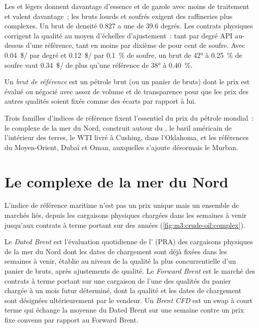 Les  et légers donnent davantage d'essence et de gazole avec moins de traitement et
valent davantage~; les bruts lourds et soufrés exigent des raffineries plus complexes. Un brut de
densité 0.827 a une  de 39.6 degrés. Les contrats physiques corrigent la qualité au moyen
d'échelles d'ajustement~: tant par degré API au-dessus d'une référence, tant en moins par dixième
de pour cent de soufre. Avec \qty{0.04}{\$/\barrel} par degré et
\qty{0.12}{\$/\barrel} par 0.1~\% de soufre, un brut de 42° à 0.25~\% de soufre vaut
\qty{0.34}{\$/\barrel} de plus qu'une référence de 38° à 0.40~\%.

\begin{definition}\label{def:m3:crude-oil:benchmark}
Un \emph{brut de référence} est un pétrole brut (ou un panier de
bruts) dont le prix est évalué ou négocié avec assez de volume et de transparence pour que
les prix des autres qualités soient fixés comme des écarts par rapport à lui.
\end{definition}

Trois familles d'indices de référence fixent l'essentiel du prix du pétrole mondial~: le complexe
de la mer du Nord, construit autour du , le baril américain de l'intérieur des terres, le WTI livré à Cushing,
dans l'Oklahoma, et les références du Moyen-Orient, Dubaï et Oman, auxquelles s'ajoute désormais le Murban.

\section{Le complexe de la mer du Nord}

L'indice de référence maritime n'est pas un prix unique mais un ensemble de marchés liés, depuis les
cargaisons physiques chargées dans les semaines à venir jusqu'aux contrats à terme portant sur des années
(\cref{fig:m3:crude-oil:complex}).

\begin{definition}\label{def:m3:crude-oil:brent}
Le \emph{Dated Brent} est l'évaluation quotidienne de l' (PRA)
des cargaisons physiques de la mer du Nord dont les dates de chargement sont déjà fixées dans les
semaines à venir, établie au niveau de la qualité la plus concurrentielle d'un panier de bruts, après
ajustements de qualité. Le \emph{Forward Brent} est le marché des contrats à terme
portant sur une cargaison de l'une des qualités du panier chargée à un mois futur déterminé,
dont la qualité et les dates de chargement sont désignées ultérieurement par le vendeur. Un \emph{Brent
CFD} est un swap à court terme qui échange la moyenne du Dated Brent
sur une semaine contre un prix fixe convenu par rapport au Forward Brent.
\end{definition}

